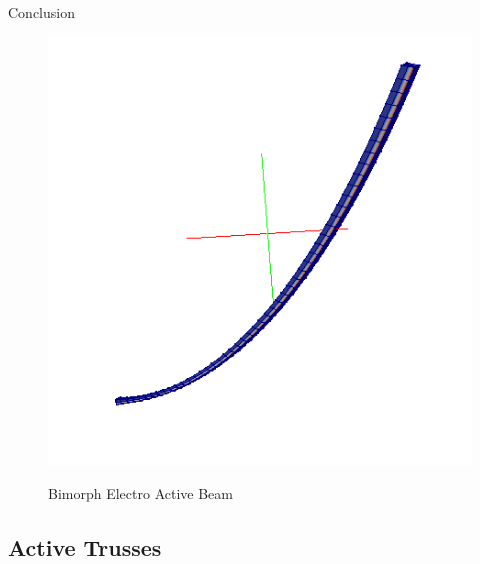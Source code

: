 \documentclass{beamer}
\begin{document}
\begin{frame}{Conclusion}
\begin{figure}
\includegraphics[scale=0.3,trim = 0mm 0mm 0mm
00mm]{../images/EAP_BEAM_EPOT_DEFLECTION.png}
\label{fig:EAP_BEAM}
\caption{Bimorph Electro Active Beam}
\end{figure}
\end{frame}

\subsection{Active Trusses}
\end{document}
